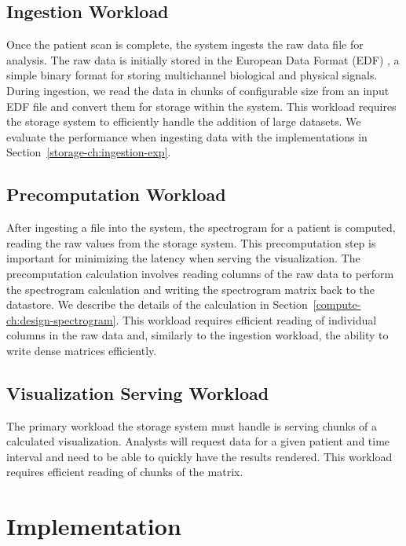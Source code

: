 \subsection{Ingestion Workload}

Once the patient scan is complete, the system ingests the raw data file for
analysis. The raw data is initially stored in the European Data Format (EDF)
\cite{edf}, a simple binary format for storing multichannel biological and
physical signals. During ingestion, we read the data in chunks of configurable
size from an input EDF file and convert them for storage within the system.
This workload requires the storage system to efficiently handle the addition of
large datasets. We evaluate the performance when ingesting data with the
implementations in Section~\ref{storage-ch:ingestion-exp}.


\subsection{Precomputation Workload}

After ingesting a file into the system, the spectrogram for a patient is
computed, reading the raw values from the storage system. This precomputation
step is important for minimizing the latency when serving the visualization.
The precomputation calculation involves reading columns of the raw data to
perform the spectrogram calculation and writing the spectrogram matrix back to
the datastore. We describe the details of the calculation in
Section~\ref{compute-ch:design-spectrogram}. This workload requires efficient
reading of individual columns in the raw data and, similarly to the ingestion
workload, the ability to write dense matrices efficiently.

\subsection{Visualization Serving Workload}

The primary workload the storage system must handle is serving chunks of a
calculated visualization. Analysts will request data for a given patient and
time interval and need to be able to quickly have the results rendered. This
workload requires efficient reading of chunks of the matrix.

\section{Implementation}


